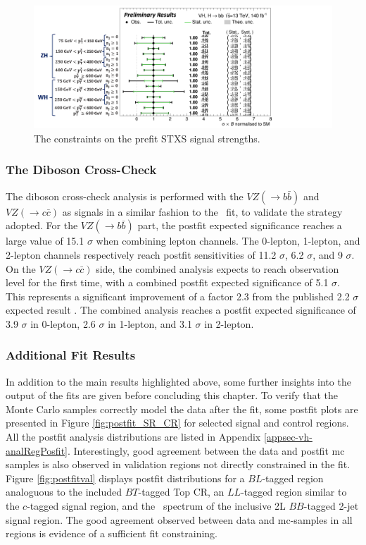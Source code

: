 \begin{figure}[h!]
    \centering
    \includegraphics[width=\textwidth]{Images/VH/Fit/fromSlides/STXS_cons.png}
    \caption{The constraints on the prefit STXS signal strengths.}
    \label{fig:fit-stxs-cons}
\end{figure} 

\subsubsection{The Diboson Cross-Check}\label{subsec-DibosonC}
The diboson cross-check analysis is performed with the $VZ (\rightarrow b\bar{b})$ and $VZ (\rightarrow c\bar{c})$ as signals in a similar fashion to the \vhbc\ fit, to validate the strategy adopted. For the $VZ (\rightarrow b\bar{b})$ part, the postfit expected significance reaches a large value of 15.1 $\sigma$ when combining lepton channels. The 0-lepton, 1-lepton, and 2-lepton channels respectively reach postfit sensitivities of 11.2 $\sigma$, 6.2 $\sigma$, and 9 $\sigma$. On the $VZ (\rightarrow c\bar{c})$ side, the combined analysis expects to reach observation level for the first time, with a combined postfit expected significance of 5.1 $\sigma$. This represents a significant improvement of a factor 2.3 from the published 2.2 $\sigma$ expected result \cite{Collaboration:2721696}. The combined analysis reaches a postfit expected significance of 3.9 $\sigma$ in 0-lepton, 2.6 $\sigma$ in 1-lepton, and 3.1 $\sigma$ in 2-lepton.

\subsubsection{Additional Fit Results}
In addition to the main results highlighted above, some further insights into the output of the fits are given before concluding this chapter. To verify that the Monte Carlo samples correctly model the data after the fit, some postfit plots are presented in Figure \ref{fig:postfit_SR_CR} for selected signal and control regions. All the postfit analysis distributions are listed in Appendix \ref{appsec-vh-analRegPosfit}. Interestingly, good agreement between the data and postfit \gls{mc} samples is also observed in validation regions not directly constrained in the fit. Figure \ref{fig:postfitval} displays postfit distributions for a $BL$-tagged region analoguous to the included $BT$-tagged Top CR, an $LL$-tagged region similar to the $c$-tagged signal region, and the \ptv\ spectrum of the inclusive 2L $BB$-tagged 2-jet signal region. The good agreement observed between data and \gls{mc}-samples in all regions is evidence of a sufficient fit constraining. \\


